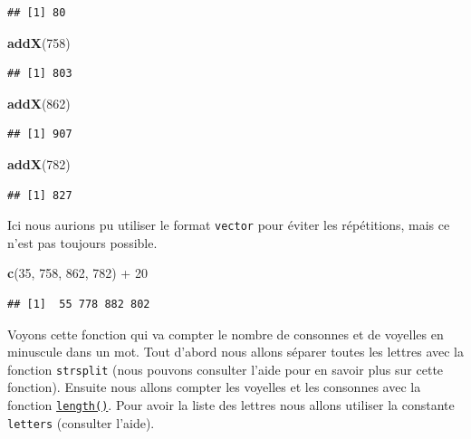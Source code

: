 \documentclass[twoside,symmetric]{book}
\newenvironment{Shaded}{}{}
\newcommand{\DecValTok}[1]{#1}
\newcommand{\KeywordTok}[1]{\textbf{#1}}
\newcommand{\NormalTok}[1]{#1}
\newcommand{\OperatorTok}[1]{#1}
\newcommand{\StringTok}[1]{#1}
\begin{document}
\begin{verbatim}
## [1] 80
\end{verbatim}

\begin{Shaded}
\begin{Highlighting}[]
\KeywordTok{addX}\NormalTok{(}\DecValTok{758}\NormalTok{)}
\end{Highlighting}
\end{Shaded}

\begin{verbatim}
## [1] 803
\end{verbatim}

\begin{Shaded}
\begin{Highlighting}[]
\KeywordTok{addX}\NormalTok{(}\DecValTok{862}\NormalTok{)}
\end{Highlighting}
\end{Shaded}

\begin{verbatim}
## [1] 907
\end{verbatim}

\begin{Shaded}
\begin{Highlighting}[]
\KeywordTok{addX}\NormalTok{(}\DecValTok{782}\NormalTok{)}
\end{Highlighting}
\end{Shaded}

\begin{verbatim}
## [1] 827
\end{verbatim}

Ici nous aurions pu utiliser le format \texttt{vector} pour éviter les répétitions, mais ce n'est pas toujours possible.

\begin{Shaded}
\begin{Highlighting}[]
\KeywordTok{c}\NormalTok{(}\DecValTok{35}\NormalTok{, }\DecValTok{758}\NormalTok{, }\DecValTok{862}\NormalTok{, }\DecValTok{782}\NormalTok{) }\OperatorTok{+}\StringTok{ }\DecValTok{20}
\end{Highlighting}
\end{Shaded}

\begin{verbatim}
## [1]  55 778 882 802
\end{verbatim}

Voyons cette fonction qui va compter le nombre de consonnes et de voyelles en minuscule dans un mot. Tout d'abord nous allons séparer toutes les lettres avec la fonction \texttt{strsplit} (nous pouvons consulter l'aide pour en savoir plus sur cette fonction). Ensuite nous allons compter les voyelles et les consonnes avec la fonction \protect\hyperlink{l015length}{\texttt{length()}}. Pour avoir la liste des lettres nous allons utiliser la constante \texttt{letters} (consulter l'aide).
\end{document}
